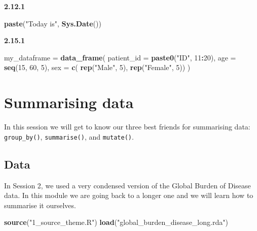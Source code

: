 \documentclass[]{book}
\makeatletter
\newenvironment{Shaded}{\begin{snugshade}}{\end{snugshade}}
\newcommand{\KeywordTok}[1]{\textcolor[rgb]{0.13,0.29,0.53}{\textbf{#1}}}
\newcommand{\DataTypeTok}[1]{\textcolor[rgb]{0.13,0.29,0.53}{#1}}
\newcommand{\DecValTok}[1]{\textcolor[rgb]{0.00,0.00,0.81}{#1}}
\newcommand{\StringTok}[1]{\textcolor[rgb]{0.31,0.60,0.02}{#1}}
\newcommand{\OperatorTok}[1]{\textcolor[rgb]{0.81,0.36,0.00}{\textbf{#1}}}
\newcommand{\NormalTok}[1]{#1}
\newenvironment{kframe}{%
\medskip{}
\setlength{\fboxsep}{.8em}
 \def\at@end@of@kframe{}%
 \ifinner\ifhmode%
  \def\at@end@of@kframe{\end{minipage}}%
  \begin{minipage}{\columnwidth}%
 \fi\fi%
 \def\FrameCommand##1{\hskip\@totalleftmargin \hskip-\fboxsep
 \colorbox{shadecolor}{##1}\hskip-\fboxsep
     \hskip-\linewidth \hskip-\@totalleftmargin \hskip\columnwidth}%
 \MakeFramed {\advance\hsize-\width
   \@totalleftmargin\z@ \linewidth\hsize
   \@setminipage}}%
 {\par\unskip\endMakeFramed%
 \at@end@of@kframe}
\renewenvironment{Shaded}{\begin{kframe}}{\end{kframe}}
\makeatother
\begin{document}
\textbf{2.12.1}

\begin{Shaded}
\begin{Highlighting}[]
\KeywordTok{paste}\NormalTok{(}\StringTok{"Today is"}\NormalTok{, }\KeywordTok{Sys.Date}\NormalTok{())}
\end{Highlighting}
\end{Shaded}

\textbf{2.15.1}

\begin{Shaded}
\begin{Highlighting}[]
\NormalTok{my_dataframe =}\StringTok{ }\KeywordTok{data_frame}\NormalTok{(}
  \DataTypeTok{patient_id =} \KeywordTok{paste0}\NormalTok{(}\StringTok{"ID"}\NormalTok{, }\DecValTok{11}\OperatorTok{:}\DecValTok{20}\NormalTok{),}
  \DataTypeTok{age        =} \KeywordTok{seq}\NormalTok{(}\DecValTok{15}\NormalTok{, }\DecValTok{60}\NormalTok{, }\DecValTok{5}\NormalTok{),}
  \DataTypeTok{sex        =} \KeywordTok{c}\NormalTok{( }\KeywordTok{rep}\NormalTok{(}\StringTok{"Male"}\NormalTok{, }\DecValTok{5}\NormalTok{), }\KeywordTok{rep}\NormalTok{(}\StringTok{"Female"}\NormalTok{, }\DecValTok{5}\NormalTok{))}
\NormalTok{)}
\end{Highlighting}
\end{Shaded}

\chapter{Summarising data}\label{summarising-data}

In this session we will get to know our three best friends for
summarising data: \texttt{group\_by()}, \texttt{summarise()}, and
\texttt{mutate()}.

\section{Data}\label{data-1}

In Session 2, we used a very condensed version of the Global Burden of
Disease data. In this module we are going back to a longer one and we
will learn how to summarise it ourselves.

\begin{Shaded}
\begin{Highlighting}[]
\KeywordTok{source}\NormalTok{(}\StringTok{"1_source_theme.R"}\NormalTok{)}
\KeywordTok{load}\NormalTok{(}\StringTok{"global_burden_disease_long.rda"}\NormalTok{)}
\end{Highlighting}
\end{Shaded}
\end{document}
